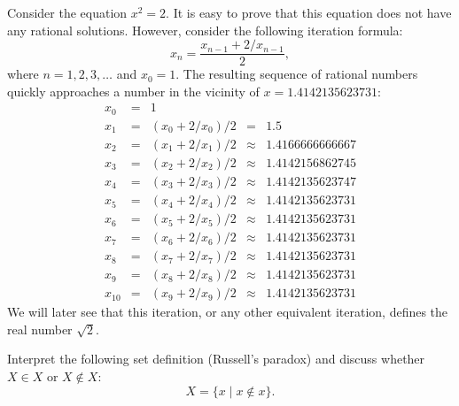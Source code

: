 \begin{example}[Solving the equation $x^2 = 2$]
Consider the equation $x^2 = 2$. It is easy to prove that this equation does not have any rational solutions. However, consider the following iteration formula:
    \begin{equation}
        x_n = \frac{x_{n-1} + 2 / x_{n - 1}}{2},
    \end{equation}
    where $n = 1,2,3,\ldots$ and $x_0 = 1$. The resulting sequence of rational numbers quickly approaches a number in the vicinity of $x = 1.4142135623731$:
    \begin{displaymath}
        \begin{array}{rclcl}
            x_0 &=& 1 \\
            x_{1} &=& (x_{0} + 2 / x_{0}) / 2 &=& 1.5 \\
            x_{2} &=& (x_{1} + 2 / x_{1}) / 2 &\approx& 1.4166666666667 \\
            x_{3} &=& (x_{2} + 2 / x_{2}) / 2 &\approx& 1.4142156862745 \\
            x_{4} &=& (x_{3} + 2 / x_{3}) / 2 &\approx& 1.4142135623747 \\
            x_{5} &=& (x_{4} + 2 / x_{4}) / 2 &\approx& 1.4142135623731 \\
            x_{6} &=& (x_{5} + 2 / x_{5}) / 2 &\approx& 1.4142135623731 \\
            x_{7} &=& (x_{6} + 2 / x_{6}) / 2 &\approx& 1.4142135623731 \\
            x_{8} &=& (x_{7} + 2 / x_{7}) / 2 &\approx& 1.4142135623731 \\
            x_{9} &=& (x_{8} + 2 / x_{8}) / 2 &\approx& 1.4142135623731 \\
            x_{10} &=& (x_{9} + 2 / x_{9}) / 2 &\approx& 1.4142135623731
        \end{array}
    \end{displaymath}
    We will later see that this iteration, or any other equivalent iteration, defines the real number $\sqrt{2}$.
\end{example}

\begin{problem}
Interpret the following set definition (Russell's paradox) and discuss whether $X \in X$ or $X \notin X$:
    \begin{equation}
        X = \{x \mid x \notin x\}.
    \end{equation}

\begin{solution}
\lipsum[1]
\end{solution}
\end{problem}

